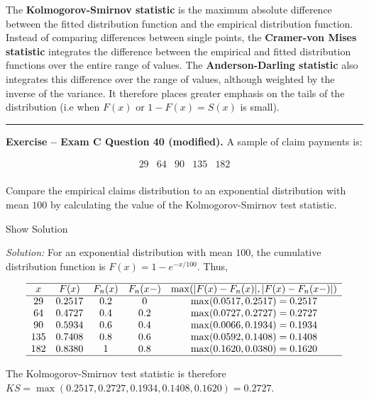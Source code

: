 \documentclass[]{book}
\theoremstyle{definition}
\theoremstyle{definition}
\theoremstyle{definition}
\theoremstyle{remark}
\begin{document}
The \textbf{Kolmogorov-Smirnov statistic} is the maximum absolute
difference between the fitted distribution function and the empirical
distribution function. Instead of comparing differences between single
points, the \textbf{Cramer-von Mises statistic} integrates the
difference between the empirical and fitted distribution functions over
the entire range of values. The \textbf{Anderson-Darling statistic} also
integrates this difference over the range of values, although weighted
by the inverse of the variance. It therefore places greater emphasis on
the tails of the distribution (i.e when \(F(x)\) or \(1-F(x)=S(x)\) is
small).

\begin{center}\rule{0.5\linewidth}{\linethickness}\end{center}

\textbf{Exercise -- Exam C Question 40 (modified).} A sample of claim
payments is:

\[\begin{array}{ccccc}
29 & 64 & 90 & 135 & 182  \\
\end{array}\]

Compare the empirical claims distribution to an exponential distribution
with mean \(100\) by calculating the value of the Kolmogorov-Smirnov
test statistic.

Show Solution

\hypertarget{toggleExamC40}{}
\emph{Solution:} For an exponential distribution with mean \(100\), the
cumulative distribution function is \(F(x)=1-e^{-x/100}\). Thus,

\[\begin{array}{ccccc}
\hline
x & F(x) & F_n(x) & F_n(x-) & \max(|F(x)-F_n(x)|,|F(x)-F_n(x-)|) \\
\hline 
29  & 0.2517 & 0.2 & 0   & \max(0.0517, 0.2517) = 0.2517 \\
64  & 0.4727 & 0.4 & 0.2 & \max(0.0727, 0.2727) = 0.2727 \\
90  & 0.5934 & 0.6 & 0.4 & \max(0.0066, 0.1934) = 0.1934 \\
135 & 0.7408 & 0.8 & 0.6 & \max(0.0592, 0.1408) = 0.1408 \\
182 & 0.8380 & 1   & 0.8 & \max(0.1620, 0.0380) = 0.1620 \\
\hline
\end{array}\]

The Kolmogorov-Smirnov test statistic is therefore
\(KS = \max(0.2517, 0.2727, 0.1934, 0.1408, 0.1620) = 0.2727\).
\end{document}
